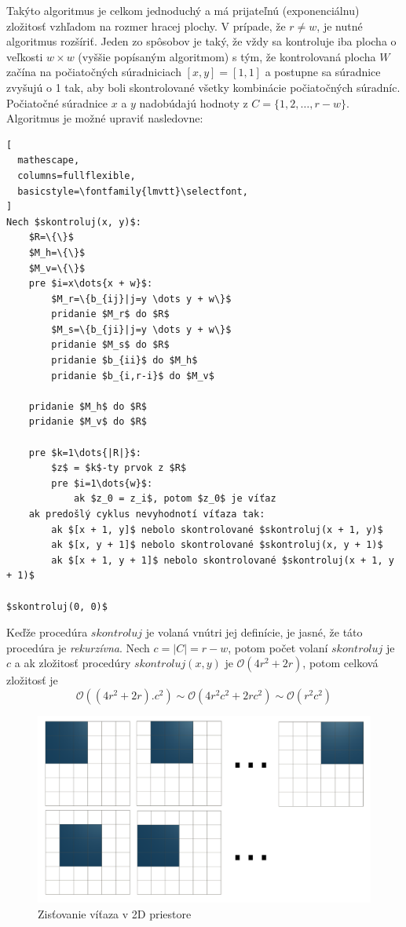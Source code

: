 Takýto algoritmus je celkom jednoduchý a má prijateľnú (exponenciálnu) zložitosť vzhľadom na rozmer hracej plochy.
V prípade, že $r \neq w$, je nutné algoritmus rozšíriť.
Jeden zo spôsobov je taký, že vždy sa kontroluje iba plocha o veľkosti $w \times w$ (vyššie popísaným algoritmom) s
tým, že kontrolovaná plocha $W$ začína na počiatočných súradniciach $[x,y]=[1,1]$ a postupne sa súradnice zvyšujú o 1
tak, aby boli skontrolované všetky kombinácie počiatočných súradníc.
Počiatočné súradnice $x$ a $y$ nadobúdajú hodnoty z $C = \{1, 2, \dots, r - w\}$.
Algoritmus je možné upraviť nasledovne:
\begin{lstlisting}[
  mathescape,
  columns=fullflexible,
  basicstyle=\fontfamily{lmvtt}\selectfont,
]
Nech $skontroluj(x, y)$:
    $R=\{\}$
    $M_h=\{\}$
    $M_v=\{\}$
    pre $i=x\dots{x + w}$:
        $M_r=\{b_{ij}|j=y \dots y + w\}$
        pridanie $M_r$ do $R$
        $M_s=\{b_{ji}|j=y \dots y + w\}$
        pridanie $M_s$ do $R$
        pridanie $b_{ii}$ do $M_h$
        pridanie $b_{i,r-i}$ do $M_v$

    pridanie $M_h$ do $R$
    pridanie $M_v$ do $R$

    pre $k=1\dots{|R|}$:
        $z$ = $k$-ty prvok z $R$
        pre $i=1\dots{w}$:
            ak $z_0 = z_i$, potom $z_0$ je víťaz
    ak predošlý cyklus nevyhodnotí víťaza tak:
        ak $[x + 1, y]$ nebolo skontrolované $skontroluj(x + 1, y)$
        ak $[x, y + 1]$ nebolo skontrolované $skontroluj(x, y + 1)$
        ak $[x + 1, y + 1]$ nebolo skontrolované $skontroluj(x + 1, y + 1)$

$skontroluj(0, 0)$
\end{lstlisting}
Keďže procedúra $skontroluj$ je volaná vnútri jej definície, je jasné, že táto procedúra je \emph{rekurzívna}.
Nech $c = |C| = r - w$, potom počet volaní $skontroluj$ je $c$ a ak zložitosť procedúry $skontroluj(x, y)$ je
$\mathcal{O}(4r^2 + 2r)$, potom celková zložitosť je
\begin{equation}
    \mathcal{O}((4r^2 + 2r).c^2) \sim \mathcal{O}(4r^2c^2 + 2rc^2) \sim \mathcal{O}(r^2c^2)
\end{equation}

\begin{figure}[H]
    \centering
    \includegraphics[width=1\textwidth]{images/winner-2D.png}
    \caption{Zisťovanie víťaza v 2D priestore}
\end{figure}

